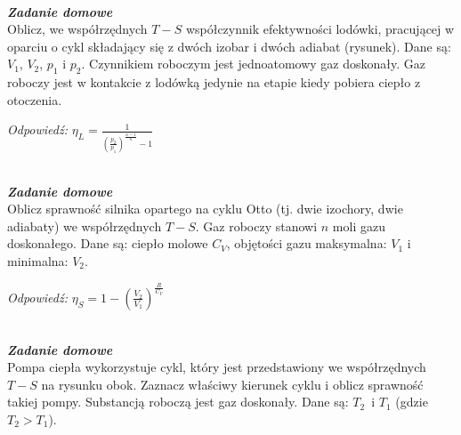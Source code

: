\documentclass[11pt,a4paper]{article}
\newcounter{zaddom}\newcommand{\zaddom}[1][]{\addtocounter{zaddom}{1} ~\\  {\bf \emph{Zadanie domowe \arabic{zaddom} #1 }} \\}
\begin{document}
\begin{figure}\vspace{-8mm}
\end{figure}
\zaddom
Oblicz, we współrzędnych $T-S$ współczynnik efektywności lodówki, pracującej w oparciu o cykl składający
się z dwóch izobar i dwóch adiabat (rysunek). Dane są: $V_1$, $V_2$, $p_1$ i $p_2$.
Czynnikiem roboczym jest jednoatomowy gaz doskonały. Gaz roboczy jest w kontakcie z lodówką 
jedynie na etapie kiedy pobiera ciepło z otoczenia.

{\it Odpowiedź:} $\eta_L = \frac{1}{\left( \frac{p_2}{p_1}\right)^{\frac{\kappa-1}{\kappa}} -1 }$



\zaddom
Oblicz sprawność silnika opartego na cyklu Otto (tj. dwie izochory, dwie adiabaty)
we współrzędnych $T-S$. Gaz roboczy stanowi $n$ moli gazu doskonałego.
Dane są: ciepło molowe $C_V$, objętości gazu maksymalna: $V_1$ i 
 minimalna: $V_2$.

{\it Odpowiedź:} $\eta_S = 1 - \left( \frac{V_2}{V_1}\right)^{\frac{R}{C_V}}$

\vspace*{5mm}

\begin{figure}\vspace{-10mm}
\end{figure}
\zaddom
Pompa ciepła wykorzystuje cykl, który jest przedstawiony
we współrzędnych $T-S$ na rysunku obok.
Zaznacz właściwy kierunek cyklu i oblicz sprawność takiej pompy.
Substancją roboczą jest gaz doskonały.
Dane są: $T_2$~i $T_1$ (gdzie $T_2>T_1$).%
\end{document}
